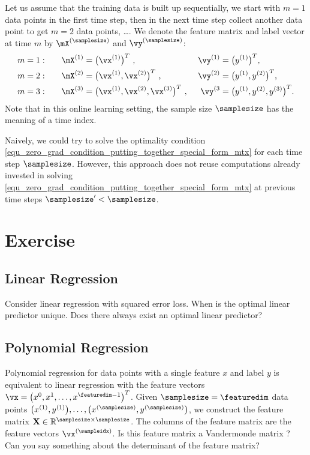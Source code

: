 \documentclass[12pt]{report}
\newcommand{\featurelen}{\featuredim}
\begin{document}
Let us assume that the training data is built up sequentially, we start with $m=1$ data points 
in the first time step, then in the next time step collect another data point to get 
$m=2$ data points, \ldots. We denote the feature matrix and label vector at time $m$ 
by $\mX^{(\samplesize)}$ and $\vy^{(\samplesize)}$: 
\begin{align}
m&=1: \quad &\mX^{(1)} & = \big( \vx^{(1)} \big)^{T}  \mbox{ , } & \vy^{(1)} & = \big( y^{(1)} \big)^{T} \mbox{, } \\ 
m&=2: \quad &\mX^{(2)} & = \big( \vx^{(1)},\vx^{(2)} \big)^{T}  \mbox{ , } & \vy^{(2)} & = \big( y^{(1)},y^{(2)} \big)^{T} \mbox{, } \\ 
m&=3: \quad &\mX^{(3)} & = \big( \vx^{(1)},\vx^{(2)},\vx^{(3)} \big)^{T}  \mbox{ , } & \vy^{(3} & = \big( y^{(1)},y^{(2)},y^{(3)} \big)^{T}.
\end{align} 
Note that in this online learning setting, the sample size $\samplesize$ has the meaning of a time index. 

Naively, we could try to solve the optimality condition \eqref{equ_zero_grad_condition_putting_together_special_form_mtx} 
for each time step $\samplesize$. However, this approach does not reuse computations already invested 
in solving \eqref{equ_zero_grad_condition_putting_together_special_form_mtx} at previous time steps $\samplesize' < \samplesize$. 





\section{Exercise} 
\label{sec_exercise_chap_4} 

\subsection{Linear Regression}
\label{ex_chap_5_lin_reg} 
Consider linear regression with squared error loss. When is the optimal linear predictor 
unique. Does there always exist an optimal linear predictor?

\subsection{Polynomial Regression} 
\label{ex_chap_5_poly_reg} 
Polynomial regression for data points with a single feature $x$ and 
label $y$ is equivalent to linear regression with the feature 
vectors $\vx = \big(x^{0},x^{1},\ldots,x^{\featuredim-1}\big)^{T}$. 
Given $\samplesize = \featurelen$ data points $\big(x^{(1)},y^{(1)}\big),\ldots,\big(x^{(\samplesize)},y^{(\samplesize)}\big)$, 
we construct the feature matrix $\mathbf{X} \in \mathbb{R}^{\samplesize \times \samplesize}$. 
The columns of the feature matrix are the feature vectors $\vx^{(\sampleidx)}$. 
Is this feature matrix a Vandermonde matrix \cite{Gautschi1988}? Can you say 
something about the determinant of the feature matrix?
\end{document}

